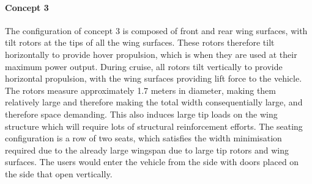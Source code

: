 \paragraph{Concept 3}
The configuration of concept 3 is composed of front and rear wing surfaces, with tilt rotors at the tips of all the wing surfaces. These rotors therefore tilt horizontally to provide hover propulsion, which is when they are used at their maximum power output. During cruise, all rotors tilt vertically to provide horizontal propulsion, with the wing surfaces providing lift force to the vehicle. The rotors measure approximately 1.7 meters in diameter, making them relatively large and therefore making the total width consequentially large, and therefore space demanding. This also induces large tip loads on the wing structure which will require lots of structural reinforcement efforts. The seating configuration is a row of two seats, which satisfies the width minimisation required due to the already large wingspan due to large tip rotors and wing surfaces. The users would enter the vehicle from the side with doors placed on the side that open vertically.  

